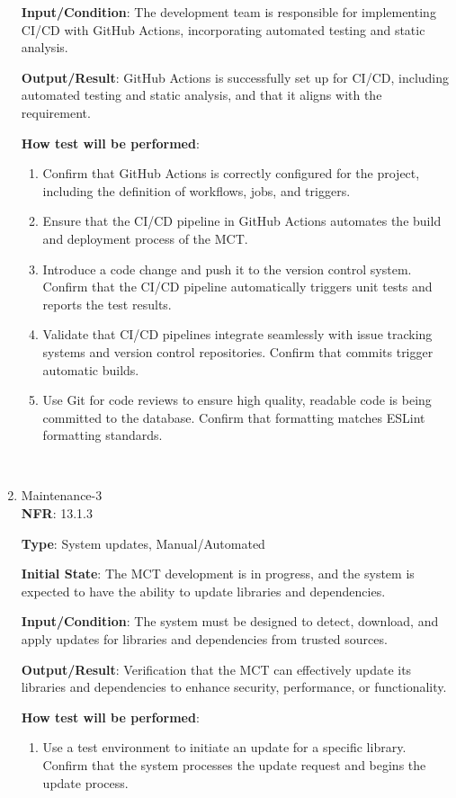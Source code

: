 \documentclass[12pt, titlepage]{article}
\begin{document}
\begin{enumerate}
\textbf{Input/Condition}: The development team is responsible for implementing CI/CD with GitHub Actions, incorporating automated testing and static analysis.

\textbf{Output/Result}: GitHub Actions is successfully set up for CI/CD, including automated testing and static analysis, and that it aligns with the requirement.

\textbf{How test will be performed}: 
\begin{enumerate}
    \item Confirm that GitHub Actions is correctly configured for the project, including the definition of workflows, jobs, and triggers.

    \item Ensure that the CI/CD pipeline in GitHub Actions automates the build and deployment process of the MCT.

    \item Introduce a code change and push it to the version control system. Confirm that the CI/CD pipeline automatically triggers unit tests and reports the test results.

    \item Validate that CI/CD pipelines integrate seamlessly with issue tracking systems and version control repositories. Confirm that commits trigger automatic builds.

    \item Use Git for code reviews to ensure high quality, readable code is being committed to the database. Confirm that formatting matches ESLint formatting standards.
\end{enumerate}

\\
    \item {Maintenance-3\\}
\textbf{NFR}: 13.1.3

\textbf{Type}: System updates, Manual/Automated

\textbf{Initial State}: The MCT development is in progress, and the system is expected to have the ability to update libraries and dependencies.

\textbf{Input/Condition}: The system must be designed to detect, download, and apply updates for libraries and dependencies from trusted sources.

\textbf{Output/Result}: Verification that the MCT can effectively update its libraries and dependencies to enhance security, performance, or functionality.

\textbf{How test will be performed}: 
\begin{enumerate}
    \item Use a test environment to initiate an update for a specific library. Confirm that the system processes the update request and begins the update process.


\end{enumerate}
\end{enumerate}
\end{document}
